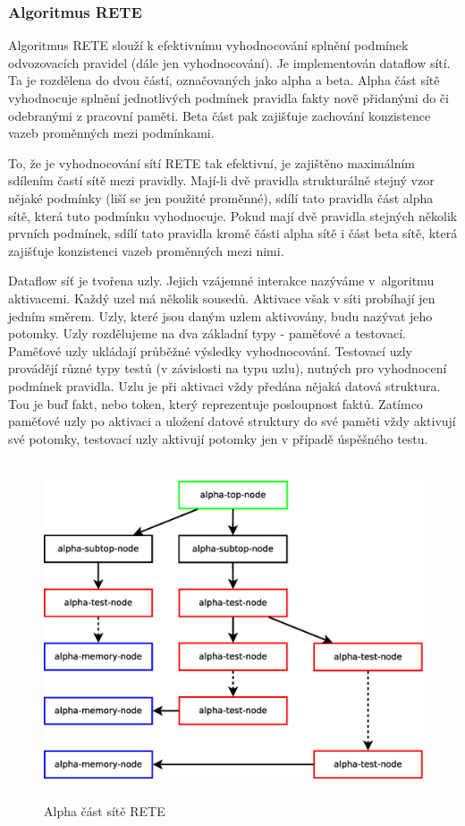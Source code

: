 \subsubsection{Algoritmus RETE}
\label{rete}

Algoritmus RETE slouží k efektivnímu vyhodnocování splnění podmínek odvozovacích
pravidel (dále jen vyhodnocování). Je implementován dataflow sítí. Ta je
rozdělena do dvou částí, označovaných jako alpha a beta. Alpha část sítě
vyhodnocuje splnění jednotlivých podmínek pravidla fakty nově přidanými do či
odebranými z pracovní paměti. Beta část pak zajišťuje zachování konzistence
vazeb proměnných mezi podmínkami.

To, že je vyhodnocování sítí RETE tak efektivní, je zajištěno maximálním
sdílením častí sítě mezi pravidly. Mají-li dvě pravidla strukturálně stejný vzor
nějaké podmínky (liší se jen použité proměnné), sdílí tato pravidla část alpha
sítě, která tuto podmínku vyhodnocuje. Pokud mají dvě pravidla stejných několik
prvních podmínek, sdílí tato pravidla kromě části alpha sítě i část beta sítě,
která zajišťuje konzistenci vazeb proměnných mezi nimi.

Dataflow síť je tvořena uzly. Jejich vzájemné interakce nazýváme v~algoritmu
aktivacemi. Každý uzel má několik sousedů. Aktivace však v síti probíhají jen
jedním směrem. Uzly, které jsou daným uzlem aktivovány, budu nazývat jeho
potomky. Uzly rozdělujeme na dva základní typy - paměťové a testovací. Paměťové
uzly ukládají průběžné výsledky vyhodnocování. Testovací uzly provádějí různé
typy testů (v závislosti na typu uzlu), nutných pro vyhodnocení podmínek
pravidla.  Uzlu je při aktivaci vždy předána nějaká datová struktura. Tou je buď
fakt, nebo token, který reprezentuje posloupnost faktů.  Zatímco paměťové uzly
po aktivaci a uložení datové struktury do své paměti vždy aktivují své potomky,
testovací uzly aktivují potomky jen v případě úspěšného testu.

\begin{figure}[h]
\centering
\includegraphics[height=10cm]{rete-alpha.eps}
\caption{Alpha část sítě RETE}
\label{rete-alpha}
\end{figure}

